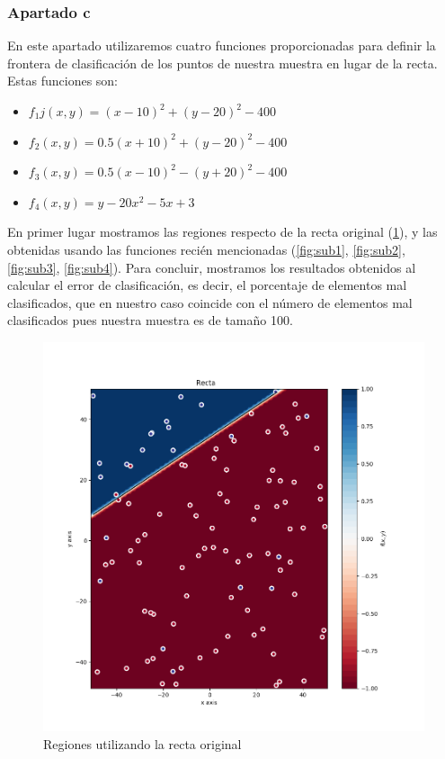 \documentclass[
  a4paper,
  spanish,
  12pt,
  enlargefirstpage,
]{scrartcl}
\begin{document}
\subsubsection*{Apartado c}%
\label{sub:apartado_c}
En este apartado utilizaremos cuatro funciones proporcionadas para definir la frontera de clasificación de los puntos de nuestra muestra en lugar de la recta. Estas funciones son:

\begin{itemize}
    \item \(f_1j(x, y) = (x-10)^2 + (y-20)^2 - 400\)
    \item \(f_2(x, y) = 0.5(x+10)^2 + (y-20)^2 - 400\)
    \item \(f_3(x, y) = 0.5(x-10)^2 - (y+20)^2 - 400\)
    \item \(f_4(x,y) = y -20x^2 - 5x + 3\)
\end{itemize}

En primer lugar mostramos las regiones respecto de la recta original (\ref{fig:img/RegRecta}), y las obtenidas usando las funciones recién mencionadas (\ref{fig:sub1}, \ref{fig:sub2}, \ref{fig:sub3}, \ref{fig:sub4}). Para concluir, mostramos los resultados obtenidos al calcular el error de clasificación, es decir, el porcentaje de elementos mal clasificados, que en nuestro caso coincide con el número de elementos mal clasificados pues nuestra muestra es de tamaño 100.

\begin{figure}[h]
    \centering
    \includegraphics[width=0.6\linewidth]{img/RegRecta.png}
    \caption{Regiones utilizando la recta original}%
    \label{fig:img/RegRecta}
\end{figure}
\end{document}
